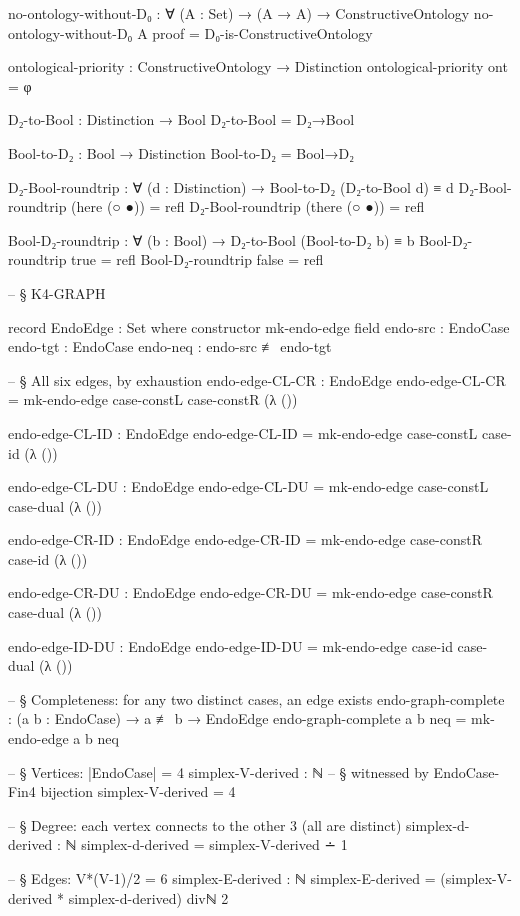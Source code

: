 \documentclass[11pt,a4paper]{book}
\begin{document}
\begin{code}
no-ontology-without-D₀ : 
  ∀ (A : Set) → 
  (A → A) →
  ConstructiveOntology
no-ontology-without-D₀ A proof = D₀-is-ConstructiveOntology

ontological-priority : 
  ConstructiveOntology → 
  Distinction
ontological-priority ont = φ


D₂-to-Bool : Distinction → Bool
D₂-to-Bool = D₂→Bool

Bool-to-D₂ : Bool → Distinction
Bool-to-D₂ = Bool→D₂

D₂-Bool-roundtrip : ∀ (d : Distinction) → Bool-to-D₂ (D₂-to-Bool d) ≡ d
D₂-Bool-roundtrip (here (○ ●))  = refl
D₂-Bool-roundtrip (there (○ ●)) = refl

Bool-D₂-roundtrip : ∀ (b : Bool) → D₂-to-Bool (Bool-to-D₂ b) ≡ b
Bool-D₂-roundtrip true  = refl
Bool-D₂-roundtrip false = refl


-- § K4-GRAPH

record EndoEdge : Set where
  constructor mk-endo-edge
  field
    endo-src  : EndoCase
    endo-tgt  : EndoCase
    endo-neq  : endo-src ≢ endo-tgt

-- § All six edges, by exhaustion
endo-edge-CL-CR : EndoEdge
endo-edge-CL-CR = mk-endo-edge case-constL case-constR (λ ())

endo-edge-CL-ID : EndoEdge
endo-edge-CL-ID = mk-endo-edge case-constL case-id (λ ())

endo-edge-CL-DU : EndoEdge
endo-edge-CL-DU = mk-endo-edge case-constL case-dual (λ ())

endo-edge-CR-ID : EndoEdge
endo-edge-CR-ID = mk-endo-edge case-constR case-id (λ ())

endo-edge-CR-DU : EndoEdge
endo-edge-CR-DU = mk-endo-edge case-constR case-dual (λ ())

endo-edge-ID-DU : EndoEdge
endo-edge-ID-DU = mk-endo-edge case-id case-dual (λ ())

-- § Completeness: for any two distinct cases, an edge exists
endo-graph-complete : (a b : EndoCase) → a ≢ b → EndoEdge
endo-graph-complete a b neq = mk-endo-edge a b neq

-- § Vertices: |EndoCase| = 4
simplex-V-derived : ℕ
-- § witnessed by EndoCase-Fin4 bijection
simplex-V-derived = 4

-- § Degree: each vertex connects to the other 3 (all are distinct)
simplex-d-derived : ℕ
simplex-d-derived = simplex-V-derived ∸ 1

-- § Edges: V*(V-1)/2 = 6
simplex-E-derived : ℕ
simplex-E-derived = (simplex-V-derived * simplex-d-derived) divℕ 2


\end{code}
\end{document}

